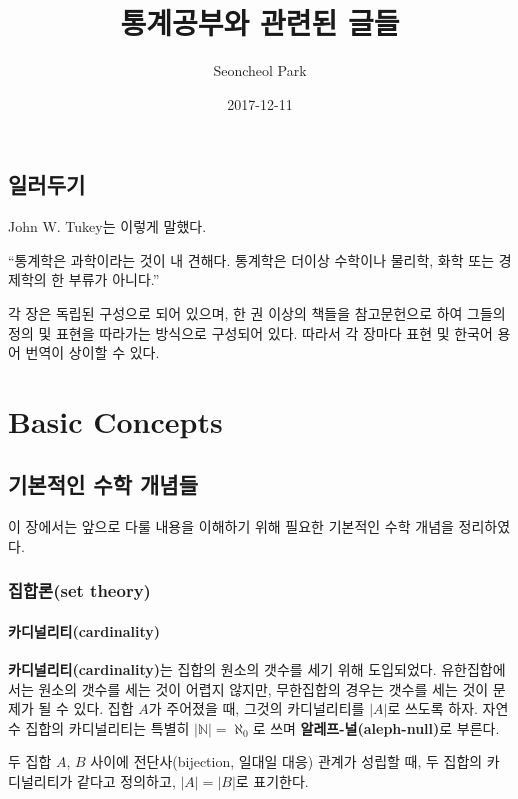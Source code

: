 \documentclass[b5paper,]{scrbook}
\title{통계공부와 관련된 글들}
\author{Seoncheol Park}
\date{2017-12-11}
\theoremstyle{plain}
\theoremstyle{definition}
\numberwithin{equation}{section}
\let\BeginKnitrBlock\begin \let\EndKnitrBlock\end
\begin{document}
\maketitle

{
\hypersetup{linkcolor=Black}
\setcounter{tocdepth}{2}
\tableofcontents
}
\chapter{일러두기}

John W. Tukey는 이렇게 말했다.

``통계학은 과학이라는 것이 내 견해다. 통계학은 더이상 수학이나 물리학,
화학 또는 경제학의 한 부류가 아니다.''

각 장은 독립된 구성으로 되어 있으며, 한 권 이상의 책들을 참고문헌으로
하여 그들의 정의 및 표현을 따라가는 방식으로 구성되어 있다. 따라서 각
장마다 표현 및 한국어 용어 번역이 상이할 수 있다.

\mainmatter

\part{Basic Concepts}\label{part-basic-concepts}

\chapter{기본적인 수학 개념들}\label{math}

이 장에서는 앞으로 다룰 내용을 이해하기 위해 필요한 기본적인 수학 개념을
정리하였다.

\section{집합론(set theory)}\label{set-theory}

\subsection{카디널리티(cardinality)}\label{cardinality}

\textbf{카디널리티(cardinality)}는 집합의 원소의 갯수를 세기 위해
도입되었다. 유한집합에서는 원소의 갯수를 세는 것이 어렵지 않지만,
무한집합의 경우는 갯수를 세는 것이 문제가 될 수 있다. 집합 \(A\)가
주어졌을 때, 그것의 카디널리티를 \(|A|\)로 쓰도록 하자. 자연수 집합의
카디널리티는 특별히 \(|\mathbb{N}|=\aleph_{0}\)로 쓰며
\textbf{알레프-널(aleph-null)}로 부른다.

\BeginKnitrBlock{definition}[카디널리티가 같다]
\protect\hypertarget{def:unnamed-chunk-1}{}{\label{def:unnamed-chunk-1}
{} }두 집합 \(A\), \(B\) 사이에
전단사(bijection, 일대일 대응) 관계가 성립할 때, 두 집합의 카디널리티가
같다고 정의하고, \(|A|=|B|\)로 표기한다.
\EndKnitrBlock{definition}
\end{document}
